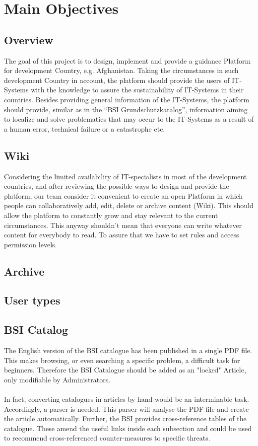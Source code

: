 \chapter{Main Objectives}
\section{Overview}
The goal of this project is to design, implement and provide a guidance Platform for development Country, e.g. Afghanistan. Taking the circumstances in such development Country in account, the platform should provide the users of IT-Systems with the knowledge to assure the sustainability of IT-Systems in their countries. Besides providing general information of the IT-Systems, the platform should provide, similar as in the “BSI Grundschutzkatalog”, information aiming to localize and solve problematics that may occur to the IT-Systems as a result of a human error, technical failure or a catastrophe etc. 

\section{Wiki}
Considering the limited availability of IT-specialists in most of the development countries, and after reviewing the possible ways to design and provide the platform, our team consider it convenient to create an open Platform in which people can collaboratively add, edit, delete or archive content (Wiki). This should allow the platform to constantly grow and stay relevant to the current circumstances. This anyway shouldn’t mean that everyone can write whatever content for everybody to read. To assure that we have to set rules and access permission levels. 

\section{Archive}
\section{User types}
\section{BSI Catalog}
The English version of the BSI catalogue has been published in a single PDF file. This makes browsing, or even searching a specific problem, a difficult task for beginners. Therefore the BSI Catalogue should be added as an "locked" Article, only modifiable by Administrators.
\\\\
In fact, converting catalogues in articles by hand would be an interminable task. Accordingly, a parser is needed. This parser will analyse the PDF file and create the article automatically. Further, the BSI provides cross-reference tables of the catalogue. These amend the useful links inside each subsection and could be used to recommend cross-referenced counter-measures to specific threats.
